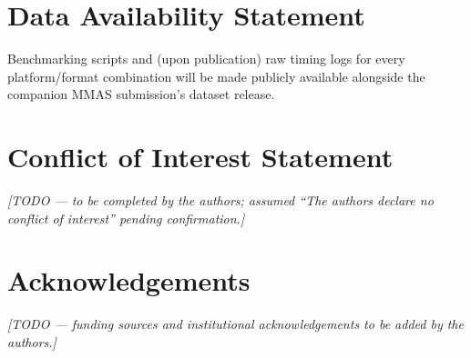 \documentclass[11pt,a4paper]{article}
\begin{document}
\section*{Data Availability Statement}
Benchmarking scripts and (upon publication) raw timing logs for every platform/format
combination will be made publicly available alongside the companion MMAS submission's
dataset release.

\section*{Conflict of Interest Statement}
\textit{[TODO --- to be completed by the authors; assumed ``The authors declare no
conflict of interest'' pending confirmation.]}

\section*{Acknowledgements}
\textit{[TODO --- funding sources and institutional acknowledgements to be added by the
authors.]}



\end{document}
